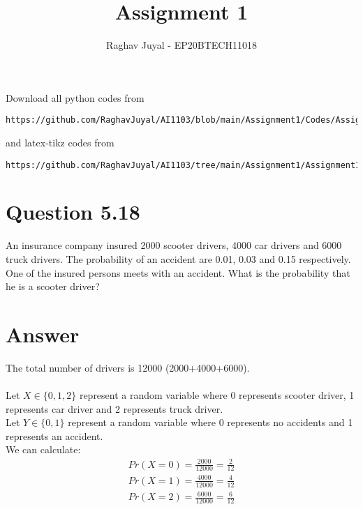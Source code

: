 \documentclass[journal,12pt,twocolumn]{IEEEtran}
\begin{document}
     \def\rightbox#1{\makebox[0in][r]{#1}}
     \def\centbox#1{\makebox[0in]{#1}}
     \def\topbox#1{\raisebox{-\baselineskip}[0in][0in]{#1}}
     \def\midbox#1{\raisebox{-0.5\baselineskip}[0in][0in]{#1}}
\vspace{3cm}
\title{Assignment 1}
\author{Raghav Juyal - EP20BTECH11018}
\maketitle
\newpage
\bigskip
\renewcommand{\thefigure}{\theenumi}
\renewcommand{\thetable}{\theenumi}
Download all python codes from 
\begin{lstlisting}
https://github.com/RaghavJuyal/AI1103/blob/main/Assignment1/Codes/Assignment1.py
\end{lstlisting}
%
and latex-tikz codes from 
%
\begin{lstlisting}
https://github.com/RaghavJuyal/AI1103/tree/main/Assignment1/Assignment1.tex
\end{lstlisting}
\section*{Question 5.18}
An insurance company insured 2000 scooter drivers, 4000 car drivers and 6000 truck drivers. The probability of an accident are 0.01, 0.03 and 0.15 respectively. One of the insured persons meets with an accident. What is the probability that he is a scooter driver?

\section*{Answer}
The total number of drivers is 12000 (2000+4000+6000).\\
\\ Let $X \in \{0,1,2\}$ represent a random variable where 0 represents scooter driver, 1 represents car driver and 2 represents truck driver.
\\ Let $Y \in \{0,1\}$ represent a random variable where 0 represents no accidents and 1 represents an accident.\\
We can calculate:\\
\begin{align}
    Pr(X=0) = \frac{2000}{12000} = \frac{2}{12}\\
    Pr(X=1) = \frac{4000}{12000} = \frac{4}{12}\\
    Pr(X=2) = \frac{6000}{12000} = \frac{6}{12}
\end{align}
\end{document}
